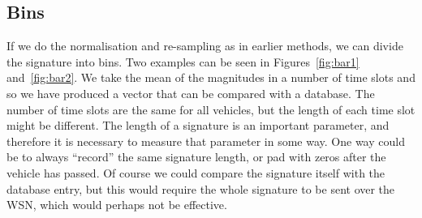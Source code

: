\subsection{Bins} %
If we do the normalisation and re-sampling as in earlier methods, we can divide the signature into bins. Two examples can be seen in Figures~\ref{fig:bar1} and~\ref{fig:bar2}. We take the mean of the magnitudes in a number of time slots and so we have produced a vector that can be compared with a database. The number of time slots are the same for all vehicles, but the length of each time slot might be different. The length of a signature is an important parameter, and therefore it is necessary to measure that parameter in some way. One way could be to always ``record'' the same signature length, or pad with zeros after the vehicle has passed. Of course we could compare the signature itself with the database entry, but this would require the whole signature to be sent over the WSN, which would perhaps not be effective.

